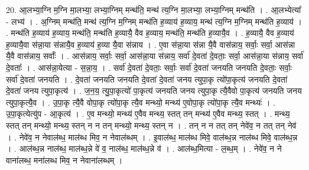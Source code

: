 \documentclass[17pt]{extarticle}
\begin{document}
20. आ॒लभ्या॒ग्नि म॒ग्नि मा॒लभ्या॒ लभ्या॒ग्निम् मन्थ॑ति॒ मन्थ॑ त्य॒ग्नि मा॒लभ्या॒ लभ्या॒ग्निम् मन्थ॑ति । . आ॒लभ्येत्या᳚ - लभ्य॑ । . अ॒ग्निम् मन्थ॑ति॒ मन्थ॑ त्य॒ग्नि म॒ग्निम् मन्थ॑ति ह॒व्याय॑ ह॒व्याय॒ मन्थ॑ त्य॒ग्नि म॒ग्निम् मन्थ॑ति ह॒व्याय॑ । . मन्थ॑ति ह॒व्याय॑ ह॒व्याय॒ मन्थ॑ति॒ मन्थ॑ति ह॒व्यायै॒ वैव ह॒व्याय॒ मन्थ॑ति॒ मन्थ॑ति ह॒व्यायै॒व । . ह॒व्यायै॒ वैव ह॒व्याय॑ ह॒व्यायै॒वा स॑न्ना॒या स॑न्नायै॒व ह॒व्याय॑ ह॒व्या यै॒वा स॑न्नाय । . ए॒वा स॑न्ना॒या स॑न्ना यै॒वै वास॑न्नाय॒ सर्वाः॒ सर्वा॒ आस॑न्ना यै॒वै वास॑न्नाय॒ सर्वाः᳚ । . आस॑न्नाय॒ सर्वाः॒ सर्वा॒ आस॑न्ना॒या स॑न्नाय॒ सर्वा॑ दे॒वता॑ दे॒वताः॒ सर्वा॒ आस॑न्ना॒या स॑न्नाय॒ सर्वा॑ दे॒वताः᳚ । . आस॑न्ना॒येत्या - स॒न्ना॒य॒ । . सर्वा॑ दे॒वता॑ दे॒वताः॒ सर्वाः॒ सर्वा॑ दे॒वता॑ जनयति जनयति दे॒वताः॒ सर्वाः॒ सर्वा॑ दे॒वता॑ जनयति । . दे॒वता॑ जनयति जनयति दे॒वता॑ दे॒वता॑ जनय त्युपा॒कृ त्यो॑पा॒कृत्य॑ जनयति दे॒वता॑ दे॒वता॑ जनय त्युपा॒कृत्य॑ । . ज॒न॒य॒ त्यु॒पा॒कृत्यो॑ पा॒कृत्य॑ जनयति जनय त्युपा॒कृ त्यै॒वैवो पा॒कृत्य॑ जनयति जनय त्युपा॒कृत्यै॒व । . उ॒पा॒कृ त्यै॒वै वोपा॒कृ त्यो॑पा॒कृ त्यै॒व मन्थ्यो॒ मन्थ्य॑ ए॒वोपा॒कृ त्यो॑पा॒कृ त्यै॒व मन्थ्यः॑ । . उ॒पा॒कृत्येत्यु॑प - आ॒कृत्य॑ । . ए॒व मन्थ्यो॒ मन्थ्य॑ ए॒वैव मन्थ्य॒ स्तत् तन् मन्थ्य॑ ए॒वैव मन्थ्य॒ स्तत् । . मन्थ्य॒ स्तत् तन् मन्थ्यो॒ मन्थ्य॒ स्तन् न न तन् मन्थ्यो॒ मन्थ्य॒ स्तन् न । . तन् न न तत् तन् नेवे॑व॒ न तत् तन् नेव॑ । . नेवे॑व॒ न नेवाल॑ब्ध॒ माल॑ब्ध मिव॒ न नेवाल॑ब्धम् । . इ॒वाल॑ब्ध॒ माल॑ब्ध मिवे॒ वाल॑ब्ध॒न्न नाल॑ब्ध मिवे॒ वाल॑ब्ध॒न्न । . आल॑ब्ध॒न्न नाल॑ब्ध॒ माल॑ब्ध॒न्ने वे॑ व॒ नाल॑ब्ध॒ माल॑ब्ध॒न्ने व॑ । . आल॑ब्ध॒मित्या - ल॒ब्ध॒म् । . नेवे॑व॒ न ने वाना॑लब्ध॒ मना॑लब्ध मिव॒ न नेवाना॑लब्धम् । \newline
\end{document}
